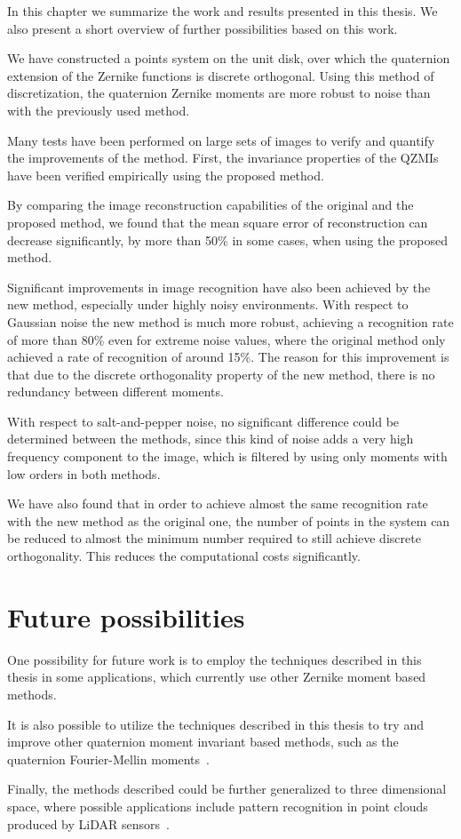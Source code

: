 In this chapter we summarize the work and results presented in this thesis. We also present a short overview of further possibilities based on this work.

We have constructed a points system on the unit disk, over which the quaternion extension of the Zernike functions is discrete orthogonal. Using this method of discretization, the quaternion Zernike moments are more robust to noise than with the previously used method.

Many tests have been performed on large sets of images to verify and quantify the improvements of the method.
First, the invariance properties of the QZMIs have been verified empirically using the proposed method.

By comparing the image reconstruction capabilities of the original and the proposed method, we found that the mean square error of reconstruction can decrease significantly, by more than 50\% in some cases, when using the proposed method.

Significant improvements in image recognition have also been achieved by the new method, especially under highly noisy environments. With respect to Gaussian noise the new method is much more robust, achieving a recognition rate of more than 80\% even for extreme noise values, where the original method only achieved a rate of recognition of around 15\%. The reason for this improvement is that due to the discrete orthogonality property of the new method, there is no redundancy between different moments.

With respect to salt-and-pepper noise, no significant difference could be determined between the methods, since this kind of noise adds a very high frequency component to the image, which is filtered by using only moments with low orders in both methods.

We have also found that in order to achieve almost the same recognition rate with the new method as the original one, the number of points in the system can be reduced to almost the minimum number required to still achieve discrete orthogonality. This reduces the computational costs significantly. 

\section{Future possibilities}
One possibility for future work is to employ the techniques described in this thesis in some applications, which currently use other Zernike moment based methods.

It is also possible to utilize the techniques described in this thesis to try and improve other quaternion moment invariant based methods, such as the quaternion Fourier-Mellin moments~\cite{qfmm}.

Finally, the methods described could be further generalized to three dimensional space, where possible applications include pattern recognition in point clouds produced by LiDAR sensors~\cite{zernike_lidar}.